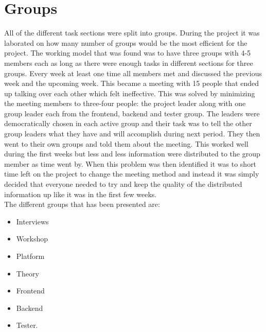 \section{Groups} 
All of the different task sections were split into groups. During the project it was laborated on how many number of groups would be the most efficient for the project. The working model that was found was to have three groups with 4-5 members each as long as there were enough tasks in different sections for three groups. Every week at least one time all members met and discussed the previous week and the upcoming week. This became a meeting with 15 people that ended up talking over each other which felt ineffective. This was solved by minimizing the meeting members to three-four people: the project leader along with one group leader each from the frontend, backend and tester group. The leaders were democratically chosen in each active group and their task was to tell the other group leaders what they have and will accomplish during next period. They then went to their own groups and told them about the meeting. This worked well during the first weeks but less and less information were distributed to the group member as time went by. When this problem was then identified it was to short time left on the project to change the meeting method and instead it was simply decided that everyone needed to try and keep the quality of the distributed information up like it was in the first few weeks. \\
The different groups that has been presented are:\\
 \begin{itemize}
 \item Interviews
 \item Workshop
 \item Platform
 \item Theory
 \item Frontend
 \item Backend
 \item Tester.
 \end{itemize}


